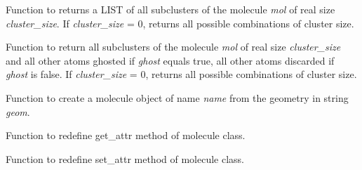 \documentclass[letterpaper,10pt,english]{sphinxmanual}
\begin{document}

\begin{fulllineitems}
\label{index:molutil.extract_cluster_indexing}
Function to returns a LIST of all subclusters of the molecule \emph{mol} of
real size \emph{cluster\_size}. If \emph{cluster\_size} = 0, returns all possible
combinations of cluster size.

\end{fulllineitems}


\begin{fulllineitems}
\label{index:molutil.extract_clusters}
Function to return all subclusters of the molecule \emph{mol} of
real size \emph{cluster\_size} and all other atoms ghosted if \emph{ghost}
equals true, all other atoms discarded if \emph{ghost} is false. If
\emph{cluster\_size} = 0, returns all possible combinations of cluster size.

\end{fulllineitems}


\begin{fulllineitems}
\label{index:molutil.geometry}
Function to create a molecule object of name \emph{name}
from the geometry in string \emph{geom}.

\end{fulllineitems}


\begin{fulllineitems}
\label{index:molutil.new_get_attr}
Function to redefine get\_attr method of molecule class.

\end{fulllineitems}


\begin{fulllineitems}
\label{index:molutil.new_set_attr}
Function to redefine set\_attr method of molecule class.

\end{fulllineitems}
\end{document}
